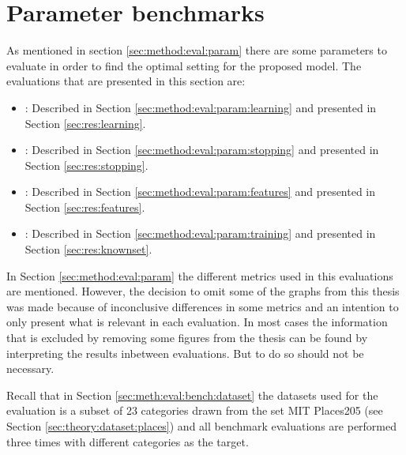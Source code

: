 \section{Parameter benchmarks}
\label{sec:res:param}

As mentioned in section \ref{sec:method:eval:param} there are some parameters to evaluate in order to find the optimal setting for the proposed model. The evaluations that are presented in this section are:
\begin{itemize}
\item \textbf{}: Described in Section \ref{sec:method:eval:param:learning} and presented in Section \ref{sec:res:learning}.
\item \textbf{}: Described in Section \ref{sec:method:eval:param:stopping} and presented in Section \ref{sec:res:stopping}.
\item \textbf{ }: Described in Section \ref{sec:method:eval:param:features} and presented in Section \ref{sec:res:features}.
\item \textbf{}: Described in Section \ref{sec:method:eval:param:training} and presented in Section \ref{sec:res:knownset}.
\end{itemize}
\medskip

In Section \ref{sec:method:eval:param} the different metrics used in this evaluations are mentioned. 
However, the decision to omit some of the graphs from this thesis was made because of inconclusive differences in some metrics and an intention to only present what is relevant in each evaluation. In most cases the information that is excluded by removing some figures from the thesis can be found by interpreting the results inbetween evaluations. But to do so should not be necessary.

Recall that in Section \ref{sec:meth:eval:bench:dataset} the datasets used for the evaluation is a subset of 23 categories drawn from the set MIT Places205 (see Section \ref{sec:theory:dataset:places}) and all benchmark evaluations are performed three times with different categories as the target.





